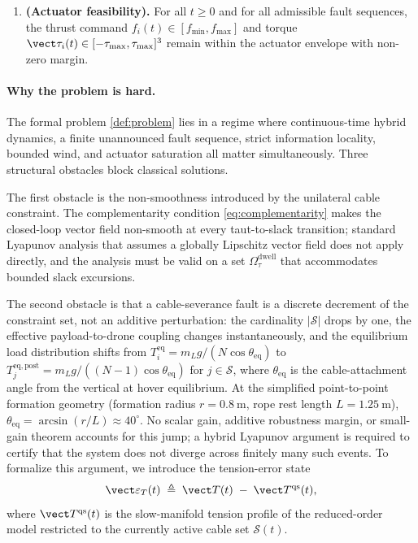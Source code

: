\begin{definition}
\begin{enumerate}[label=\textbf{P\arabic*},leftmargin=2.0em]
    \item \textbf{(Actuator feasibility).} For all $t \ge 0$ and for all admissible fault sequences, the thrust command $f_i(t) \in [f_{\min}, f_{\max}]$ and torque $\vect\tau_i(t) \in [-\tau_{\max}, \tau_{\max}]^3$ remain within the actuator envelope with non-zero margin.
\end{enumerate}
\end{definition}

\paragraph{Why the problem is hard.} The formal problem \cref{def:problem} lies in a regime where continuous-time hybrid dynamics, a finite unannounced fault sequence, strict information locality, bounded wind, and actuator saturation all matter simultaneously. Three structural obstacles block classical solutions.

The first obstacle is the non-smoothness introduced by the unilateral cable constraint. The complementarity condition \eqref{eq:complementarity} makes the closed-loop vector field
non-smooth at every taut-to-slack transition; standard Lyapunov analysis that assumes a globally Lipschitz vector field does not apply directly, and the analysis must be valid on a set $\Omega_\tau^{\mathrm{dwell}}$ that accommodates bounded slack
excursions.

The second obstacle is that a cable-severance fault is a discrete decrement of the constraint set, not an additive perturbation: the cardinality $|\mathcal{S}|$ drops by one, the effective payload-to-drone coupling changes instantaneously, and the equilibrium load distribution shifts from $T_i^{\mathrm{eq}} = m_L g / (N\cos\theta_{\mathrm{eq}})$ to $T_j^{\mathrm{eq, post}} = m_L g / ((N-1)\cos\theta_{\mathrm{eq}})$ for $j \in \mathcal{S}$, where $\theta_{\mathrm{eq}}$ is the cable-attachment angle from the vertical at hover equilibrium. At the simplified point-to-point formation geometry (formation radius $r = \SI{0.8}{\metre}$, rope rest length $L = \SI{1.25}{\metre}$), $\theta_{\mathrm{eq}} = \arcsin(r/L) \approx 40^\circ$. No scalar gain, additive robustness margin, or small-gain theorem accounts for this jump; a hybrid Lyapunov argument is required to certify that the system does not diverge across finitely many such events. To formalize this argument, we introduce the
tension-error state
\begin{equation}
  \vect\varepsilon_T(t) \;\triangleq\;
    \vect T(t) \;-\; \vect T^{\mathrm{qs}}(t),
  \label{eq:tension-error-state}
\end{equation}
where $\vect T^{\mathrm{qs}}(t)$ is the slow-manifold tension profile of the reduced-order model restricted to the currently active cable set $\mathcal{S}(t)$.

